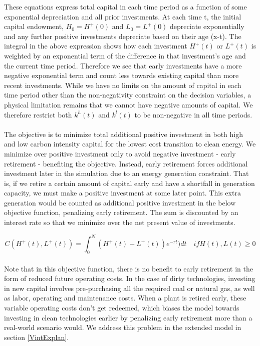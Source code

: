 \documentclass{easychithesis}
\begin{document}
These equations express total capital in each time period as a function of some exponential depreciation and all prior investments. At each time t, the initial capital endowment, $H_0 = H^+(0)$ and $L_0 = L^+(0)$ depreciate exponentially and any further positive investments depreciate based on their age (x-t). The integral in the above expression shows how each investment $H^+(t)$ or $L^+(t)$ is weighted by an exponential term of the difference in that investment's age and the current time period. Therefore we see that early investments have a more negative exponential term and count less towards existing capital than more recent investments. While we have no limits on the amount of capital in each time period other than the non-negativity constraint on the decision variables, a physical limitation remains that we cannot have negative amounts of capital. We therefore restrict both $k^h(t)$ and $k^l(t)$ to be non-negative in all time periods. 


\paragraph{} The objective is to minimize total additional positive investment in both high and low carbon intensity capital for the lowest cost transition to clean energy. We minimize over positive investment only to avoid negative investment - early retirement - benefiting the objective. Instead, early retirement forces additional investment later in the simulation due to an energy generation constraint. That is, if we retire a certain amount of capital early and have a shortfall in generation capacity, we must make a positive investment at some later point. This extra generation would be counted as additional positive investment in the below objective function, penalizing early retirement. The sum is discounted by an interest rate so that we minimize over the net present value of investments. 

\begin{equation}\label{eq:simpleObjective}
C(H^+(t), L^+(t)) = \int_0^N (H^+(t) + L^+(t))e^{-rt}) dt \quad if H(t), L(t) \geq 0
\end{equation}



\paragraph{} Note that in this objective function, there is no benefit to early retirement in the form of reduced future operating costs. In the case of dirty technologies, investing in new capital involves pre-purchasing all the required coal or natural gas, as well as labor, operating and maintenance costs. When a plant is retired early, these variable operating costs don't get redeemed, which biases the model towards investing in clean technologies earlier by penalizing early retirement more than a real-world scenario would. We address this problem in the extended model in section \ref{VintExplan}.
\end{document}
